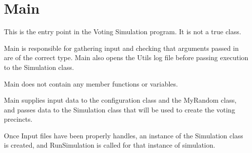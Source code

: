 %

\chapter{Main}
This is the entry point in the Voting Simulation program. It is not a true class.

Main is responsible for gathering input and checking that arguments passed in are of the correct type.  Main also opens the Utils log file before passing execution to the Simulation class.

Main does not contain any member functions or variables.

Main supplies input data to the configuration class and the MyRandom class, and passes data to the Simulation class that will be used to create the voting precincts.

Once Input files have been properly handles, an instance of the Simulation class is created, and RunSimulation is called for that instance of simulation.



